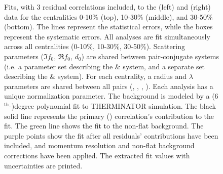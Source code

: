 \documentclass[/home/jesse/Analysis/FemtoAnalysis/AnalysisNotes/AnalysisNoteJBuxton.tex]{subfiles}
\renewcommand{\NonFlatBgdLamKch}{_NonFlatBgdCrctnPolynomial}
\renewcommand{\ResNum}{_3Res}
\renewcommand{\PrimMaxDecay}{_PrimMaxDecay10fm}
\renewcommand{\SaveNameModLamKch}{\MomRes\NonFlatBgdLamKch\ResNum\PrimMaxDecay\ResMethod\ParamFixAndShareLamKch}
\begin{document}
\begin{landscape}
\begin{figure}[h!]
  \centering
  \caption[\LamKchPALamKchM Fits with 3 Residuals]{Fits, with 3 residual correlations included, to the \LamKchP (left) and \ALamKchM (right) data for the centralities 0-10\% (top), 10-30\% (middle), and 30-50\% (bottom).
 The lines represent the statistical errors, while the boxes represent the systematic errors.  
 All \LamKpm analyses are fit simultaneously across all centralities (0-10\%, 10-30\%, 30-50\%).
 Scattering parameters ($\Im f_{0}$, $\Re f_{0}$, $d_{0}$) are shared between pair-conjugate systems (i.e. a parameter set describing the \LamKchP \& \ALamKchM system, and a separate set describing the \LamKchM \& \ALamKchP system).
 For each centrality, a radius and $\lambda$ parameters are shared between all pairs (\LamKchP, \ALamKchM, \LamKchM, \ALamKchP).
 Each analysis has a unique normalization parameter.
 The background is modeled by a (6$^{\mathrm{th}}$-)degree polynomial fit to THERMINATOR simulation.
 The black solid line represents the primary (\LamK) correlation's contribution to the fit.  
 The green line shows the fit to the non-flat background.
 The purple points show the fit after all residuals' contributions have been included, and momentum resolution and non-flat background corrections have been applied.
 The extracted fit values with uncertainties are printed.}
  \label{fig:LamKchPwConjFits_3Res}
\end{figure}


\end{landscape}
\end{document}
